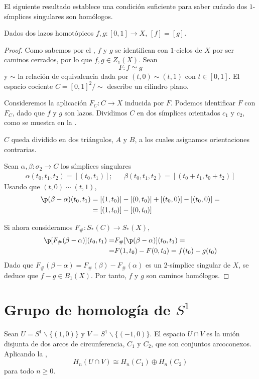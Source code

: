 El siguiente resultado establece una condición suficiente para saber
cuándo dos $1$-símplices singulares son homólogos.

\begin{lemma}
Dados dos lazos homotópicos $f,g\colon [0,1] \to X$, $[f]=[g]$.
\end{lemma}

\begin{proof}
Como sabemos por el , $f$ y $g$ se identifican
con $1$-ciclos de $X$ por ser caminos cerrados, por lo que $f,g \in Z_1(X)$.
Sean
\[F\colon f \simeq g\]
y $\sim$ la relación de equivalencia dada por $(t,0) \sim (t,1)$ con $t \in
[0,1]$. El espacio cociente $C=[0,1]^2/\sim$ describe un cilindro plano.

Consideremos la aplicación $F_C\colon C \to X$ inducida por $F$. Podemos
identificar $F$ con $F_C$, dado que $f$ y $g$ son lazos. Dividimos $C$ en dos
símplices orientados $c_1$ y $c_2$, como se muestra en la
.

\begin{marginfigure}

\caption{$C$ queda dividido en dos triángulos, $A$ y $B$, a los cuales
asignamos orientaciones contrarias.}
\end{marginfigure}

Sean $\alpha,\beta\colon \sigma_2 \to C$ los símplices singulares
\begin{align*}
\alpha(t_0,t_1,t_2)=[(t_0,t_1)]; && \beta(t_0,t_1,t_2)=[(t_0+t_1,t_0+t_2)]
\end{align*}
Usando que $(t,0)\sim (t,1)$,
\begin{align*}
\p(\beta-\alpha)(t_0,t_1)&=[(1,t_0)]-[(0,t_0)]+[(t_0,0)]-[(t_0,0)]=\\
						&=[(1,t_0)]-[(0,t_0)]
\end{align*}

Si ahora consideramos $F_\#\colon S_*(C) \to S_*(X)$,
\begin{align*}
\p [F_\#(\beta-\alpha)](t_0,t_1)=&F_\#[\p(\beta- \alpha)](t_0,t_1)=\\
                                       =&F(1,t_0)-F(0,t_0)=f(t_0)-g(t_0)
\end{align*}
Dado que $F_\#(\beta-\alpha)=F_\#(\beta)-F_\#(\alpha)$ es un 2-símplice
singular de $X$, se deduce que $f-g \in B_1(X)$. Por tanto, $f$ y $g$ son
caminos homólogos.
\end{proof}

\section{Grupo de homología de $S^1$}
Sean $U=S^1\backslash\{(1,0)\}$ y $V=S^1\backslash\{(-1,0)\}$. El espacio
$U\cap V$ es la unión disjunta de dos arcos de circunferencia, $C_1$ y $C_2$,
que son conjuntos arcoconexos. Aplicando la ,
\[H_n(U\cap V) \cong H_n(C_1)\oplus H_n(C_2)\]
para todo $n \geq 0$.

